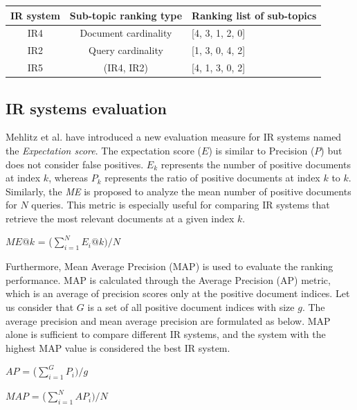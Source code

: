  
 
 \begin{center}
 	\label{tab:ir5_result}
 	\begin{tabularx}{0.8\textwidth}{|c|c|Y|}
 		\hline

 			IR system & Sub-topic ranking type & Ranking list of sub-topics \\
 		\hline
 		IR4 & Document cardinality  & [4, 3, 1, 2, 0] \\
 		\hline
 		IR2 & Query cardinality  & [1, 3, 0, 4, 2] \\
 		\hline
 		IR5 & (IR4, IR2) & [4, 1, 3, 0, 2] \\
 		\hline
 	\end{tabularx}
 \end{center}
 

\subsection{IR systems evaluation}

Mehlitz et al. \cite{mehlitz2007new} have introduced a new evaluation measure for \ac{IR} systems named the \textit{Expectation score}. The expectation score ($E$) is similar to Precision ($P$) but does not consider false positives. $E_k$ represents the number of positive documents at index $k$, whereas $P_k$ represents the ratio of positive documents at index $k$ to $k$. Similarly, the \textit{\ac{ME}} is proposed to analyze the mean number of positive documents for $N$ queries. This metric is especially useful for comparing \ac{IR} systems that retrieve the most relevant documents at a given index $k$.



\centerline{$ME@k$ = ($\sum\limits_{i=1}^N E_i@k) /N$}

Furthermore, Mean Average Precision (MAP) \cite{cormack2006statistical} is used to evaluate the ranking performance. MAP is calculated through the Average Precision (AP) metric, which is an average of precision scores only at the positive document indices. Let us consider that $G$ is a set of all positive document indices with size $g$. The average precision and mean average precision are formulated as below. MAP alone is sufficient to compare different \ac{IR} systems, and the system with the highest MAP value is considered the best \ac{IR} system.


\centerline{$AP$ = ($\sum\limits_{i=1}^G P_i) /g$}

\centerline{$MAP$ = ($\sum\limits_{i=1}^N AP_i) /N$}

